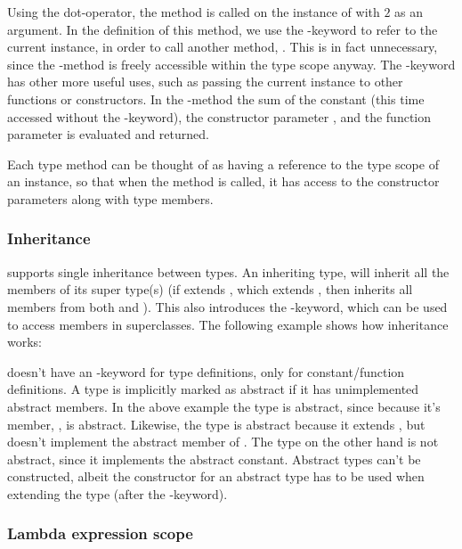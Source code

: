 Using the dot-operator, the method  is called on the instance of
 with $2$ as an argument. In the definition of this method, we use the
-keyword to refer to the current instance, in order to call another
method, . This is in fact unnecessary, since the
-method is freely accessible within the type scope anyway. The
-keyword has other more useful uses, such as passing the current
instance to other functions or constructors. In the -method
the sum of the constant  (this time accessed without the
-keyword), the constructor parameter , and the function
parameter  is evaluated and returned.

Each type method can be thought of as having a reference to the type scope of an
instance, so that when the method is called, it has access to the constructor 
parameters along with type members.

\subsubsection{Inheritance}

\productname{} supports single inheritance between types. An inheriting type, will
inherit all the members of its super type(s) (if  extends , which
extends , then  inherits all members from both  and ).
This also introduces the -keyword, which can be used to access members
in superclasses. The following example shows how inheritance works:


\productname{} doesn't have an -keyword for type definitions, only
for constant/function definitions. A type is implicitly marked as abstract if it has
unimplemented abstract members. In the above example the type  is abstract,
since because it's member, , is abstract. Likewise, the type
 is abstract because it extends , but doesn't implement the abstract
member of . The type  on the other hand is not abstract, since it
implements the abstract constant. Abstract types can't be constructed, albeit the
constructor for an abstract type has to be used when extending the type (after the
-keyword).

\subsubsection{Lambda expression scope}

